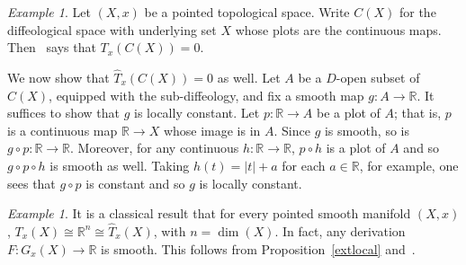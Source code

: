 \documentclass{amsart}
\theoremstyle{remark}
\newtheorem{ex}[de]{Example}
\newcommand{\ra}{\to}
\def \R{\mathbb{R}}
\begin{document}
\begin{ex}\label{top}
Let $(X,x)$ be a pointed topological space.
Write $C(X)$ for the diffeological space with underlying set $X$
whose plots are the continuous maps.
Then~\cite[Proposition~4.3]{He} says that $T_x(C(X))=0$.

We now show that $\hat{T}_x(C(X))=0$ as well.
Let $A$ be a $D$-open subset of $C(X)$, equipped with the sub-diffeology,
and fix a smooth map $g : A \to \R$.
It suffices to show that $g$ is locally constant.
Let $p : \R \to A$ be a plot of $A$;
that is, $p$ is a continuous map $\R \to X$ whose image is in $A$.
Since $g$ is smooth, so is $g \circ p : \R \to \R$.
Moreover, for any continuous $h : \R \to \R$, $p \circ h$ is a plot of $A$
and so $g \circ p \circ h$ is smooth as well.
Taking $h(t) = |t|+a$ for each $a \in \R$, for example,
one sees that $g \circ p$ is constant and so $g$ is locally constant.
\end{ex}


\begin{ex}\label{smoothmanifolds}
It is a classical result that for every pointed smooth manifold $(X,x)$,
$T_x(X) \cong \R^n \cong \hat{T}_x(X)$, with $n = \dim(X)$.
In fact, any derivation $F:G_x(X) \ra \R$ is smooth.
This follows from Proposition~\ref{extlocal} and~\cite[Lemma~4.3]{CSW}.
\end{ex}
\end{document}
